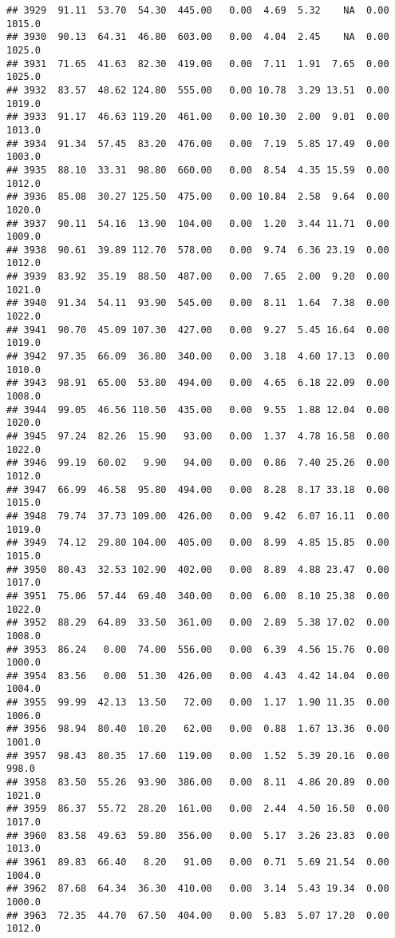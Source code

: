 \documentclass{article}\usepackage{graphicx, color}
\makeatletter
\newenvironment{kframe}{%
 \def\at@end@of@kframe{}%
 \ifinner\ifhmode%
  \def\at@end@of@kframe{\end{minipage}}%
  \begin{minipage}{\columnwidth}%
 \fi\fi%
 \def\FrameCommand##1{\hskip\@totalleftmargin \hskip-\fboxsep
 \colorbox{shadecolor}{##1}\hskip-\fboxsep
     \hskip-\linewidth \hskip-\@totalleftmargin \hskip\columnwidth}%
 \MakeFramed {\advance\hsize-\width
   \@totalleftmargin\z@ \linewidth\hsize
   \@setminipage}}%
 {\par\unskip\endMakeFramed%
 \at@end@of@kframe}
\newenvironment{knitrout}{}{} %
\makeatother
\begin{document}
\begin{knitrout}
\begin{kframe}
\begin{verbatim}
## 3929  91.11  53.70  54.30  445.00   0.00  4.69  5.32    NA  0.00 1015.0
## 3930  90.13  64.31  46.80  603.00   0.00  4.04  2.45    NA  0.00 1025.0
## 3931  71.65  41.63  82.30  419.00   0.00  7.11  1.91  7.65  0.00 1025.0
## 3932  83.57  48.62 124.80  555.00   0.00 10.78  3.29 13.51  0.00 1019.0
## 3933  91.17  46.63 119.20  461.00   0.00 10.30  2.00  9.01  0.00 1013.0
## 3934  91.34  57.45  83.20  476.00   0.00  7.19  5.85 17.49  0.00 1003.0
## 3935  88.10  33.31  98.80  660.00   0.00  8.54  4.35 15.59  0.00 1012.0
## 3936  85.08  30.27 125.50  475.00   0.00 10.84  2.58  9.64  0.00 1020.0
## 3937  90.11  54.16  13.90  104.00   0.00  1.20  3.44 11.71  0.00 1009.0
## 3938  90.61  39.89 112.70  578.00   0.00  9.74  6.36 23.19  0.00 1012.0
## 3939  83.92  35.19  88.50  487.00   0.00  7.65  2.00  9.20  0.00 1021.0
## 3940  91.34  54.11  93.90  545.00   0.00  8.11  1.64  7.38  0.00 1022.0
## 3941  90.70  45.09 107.30  427.00   0.00  9.27  5.45 16.64  0.00 1019.0
## 3942  97.35  66.09  36.80  340.00   0.00  3.18  4.60 17.13  0.00 1010.0
## 3943  98.91  65.00  53.80  494.00   0.00  4.65  6.18 22.09  0.00 1008.0
## 3944  99.05  46.56 110.50  435.00   0.00  9.55  1.88 12.04  0.00 1020.0
## 3945  97.24  82.26  15.90   93.00   0.00  1.37  4.78 16.58  0.00 1022.0
## 3946  99.19  60.02   9.90   94.00   0.00  0.86  7.40 25.26  0.00 1012.0
## 3947  66.99  46.58  95.80  494.00   0.00  8.28  8.17 33.18  0.00 1015.0
## 3948  79.74  37.73 109.00  426.00   0.00  9.42  6.07 16.11  0.00 1019.0
## 3949  74.12  29.80 104.00  405.00   0.00  8.99  4.85 15.85  0.00 1015.0
## 3950  80.43  32.53 102.90  402.00   0.00  8.89  4.88 23.47  0.00 1017.0
## 3951  75.06  57.44  69.40  340.00   0.00  6.00  8.10 25.38  0.00 1022.0
## 3952  88.29  64.89  33.50  361.00   0.00  2.89  5.38 17.02  0.00 1008.0
## 3953  86.24   0.00  74.00  556.00   0.00  6.39  4.56 15.76  0.00 1000.0
## 3954  83.56   0.00  51.30  426.00   0.00  4.43  4.42 14.04  0.00 1004.0
## 3955  99.99  42.13  13.50   72.00   0.00  1.17  1.90 11.35  0.00 1006.0
## 3956  98.94  80.40  10.20   62.00   0.00  0.88  1.67 13.36  0.00 1001.0
## 3957  98.43  80.35  17.60  119.00   0.00  1.52  5.39 20.16  0.00  998.0
## 3958  83.50  55.26  93.90  386.00   0.00  8.11  4.86 20.89  0.00 1021.0
## 3959  86.37  55.72  28.20  161.00   0.00  2.44  4.50 16.50  0.00 1017.0
## 3960  83.58  49.63  59.80  356.00   0.00  5.17  3.26 23.83  0.00 1013.0
## 3961  89.83  66.40   8.20   91.00   0.00  0.71  5.69 21.54  0.00 1004.0
## 3962  87.68  64.34  36.30  410.00   0.00  3.14  5.43 19.34  0.00 1000.0
## 3963  72.35  44.70  67.50  404.00   0.00  5.83  5.07 17.20  0.00 1012.0

\end{verbatim}
\end{kframe}
\end{knitrout}
\end{document}
